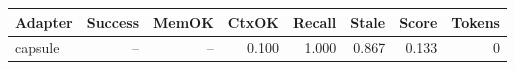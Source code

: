 \begin{tabular}{lrrrrrrr}
\hline
Adapter & Success & MemOK & CtxOK & Recall & Stale & Score & Tokens \\
\hline
capsule & -- & -- & 0.100 & 1.000 & 0.867 & 0.133 & 0 \\
\hline
\end{tabular}
